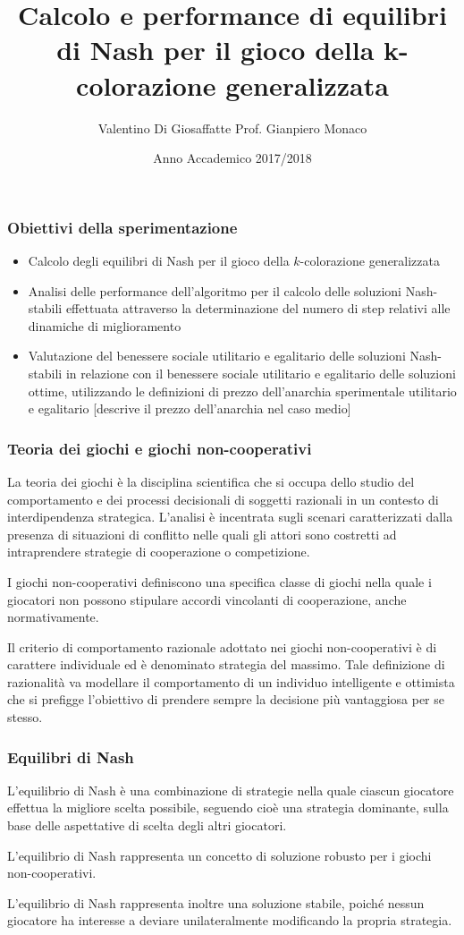 \documentclass{beamer}
\title{Calcolo e performance di equilibri di Nash per il gioco della k-colorazione generalizzata}
\author{Valentino Di Giosaffatte \hfill Prof. Gianpiero Monaco}
\institute{Università degli Studi dell'Aquila}
\date{Anno Accademico 2017/2018}
\begin{document}
\frame{\titlepage}


\begin{frame}
\frametitle{Obiettivi della sperimentazione}
\begin{itemize}
	\item Calcolo degli equilibri di Nash per il gioco della $k$-colorazione generalizzata
	\item Analisi delle performance dell'algoritmo per il calcolo delle soluzioni Nash-stabili effettuata attraverso la determinazione del numero di step relativi alle dinamiche di miglioramento
	\item Valutazione del benessere sociale utilitario e egalitario delle soluzioni Nash-stabili in relazione con il benessere sociale utilitario e egalitario delle soluzioni ottime, utilizzando le definizioni di prezzo dell'anarchia sperimentale utilitario e egalitario [descrive il prezzo dell'anarchia nel caso medio]
\end{itemize}
\end{frame}


\begin{frame}
\frametitle{Teoria dei giochi e giochi non-cooperativi}
La \alert{teoria dei giochi} è la disciplina scientifica che si occupa dello studio del comportamento e dei processi decisionali di soggetti razionali in un contesto di interdipendenza strategica. L'analisi è incentrata sugli scenari caratterizzati dalla presenza di situazioni di conflitto nelle quali gli attori sono costretti ad intraprendere strategie di cooperazione o competizione.\medskip

I \alert{giochi non-cooperativi} definiscono una specifica classe di giochi nella quale i giocatori non possono stipulare accordi vincolanti di cooperazione, anche normativamente.\medskip

Il criterio di comportamento razionale adottato nei giochi non-cooperativi è di carattere individuale ed è denominato \alert{strategia del massimo}. Tale definizione di razionalità va modellare il comportamento di un individuo intelligente e ottimista che si prefigge l'obiettivo di prendere sempre la decisione più vantaggiosa per se stesso.
\end{frame}


\begin{frame}
\frametitle{Equilibri di Nash}
L'equilibrio di Nash è una combinazione di strategie nella quale ciascun giocatore effettua la migliore scelta possibile, seguendo cioè una \alert{strategia dominante}, sulla base delle aspettative di scelta degli altri giocatori.\medskip

L'equilibrio di Nash rappresenta un \alert{concetto di soluzione} robusto per i giochi non-cooperativi.\medskip

L'equilibrio di Nash rappresenta inoltre una \alert{soluzione stabile}, poiché nessun giocatore ha interesse a deviare unilateralmente modificando la propria strategia.
\end{frame}
\end{document}
